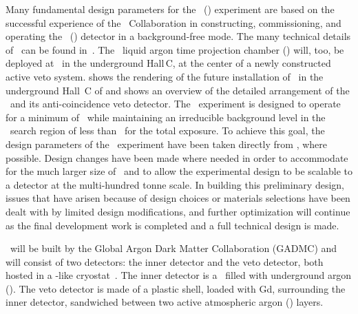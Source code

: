 Many fundamental design parameters for the \DSk\ (\DSks) experiment are based on the successful experience of the \DS\ Collaboration in constructing, commissioning, and operating the \DSf\ (\DSfs) detector in a background-free mode. The many technical details of \DSf\ can be found in~\cite{Agnes:2015gu,Agnes:2016cp,Agnes:2016fw,Agnes:2016fz,Agnes:2016tx,Agnes:2017ck,Agnes:2017cl,Agnes:2017cz,Agnes:2017ec,Agnes:2018cn,Agnes:2018dt,Agnes:2018ep,Agnes:2018fg,Agnes:2018ft}.  The \DSks\ liquid argon time projection chamber (\LArTPC) will, too, be deployed at \LNGS\ in the underground Hall\,C, at the center of a newly constructed active veto system.   shows the rendering of the future installation of \DSks\ in the underground Hall~C of \LNGS and  shows an overview of the detailed arrangement of the \LArTPC\ and its anti-coincidence veto detector.  The \DSks\ experiment is designed to operate for a minimum of \DSkExtendedRunTimePlanned\ while maintaining an irreducible background level in the \WIMP\ search region of less than \BackgroundFreeRequirement\ for the total exposure.  To achieve this goal, the design parameters of the \DSks\ experiment have been taken directly from \DSfs, where possible.  Design changes have been made where needed in order to accommodate for the much larger size of \DSks\ and to allow the experimental design to be scalable to a detector at the multi-hundred tonne scale.  In building this preliminary design, issues that have arisen because of design choices or materials selections have been dealt with by limited design modifications, and further optimization will continue as the final development work is completed and a full technical design is made.  

\DSks\ will be built by the Global Argon Dark Matter Collaboration (GADMC) and will consist of two detectors: the inner detector and the veto detector, both hosted in a \pDUNE-like cryostat~\cite{Abi:2017wp,Acciarri:2016wz}.   The inner detector is a \LArTPC\ filled with underground argon (\UAr).  The veto detector is made of a plastic shell, loaded with Gd, surrounding the inner detector, sandwiched between two active atmospheric argon (\AAr) layers.  


